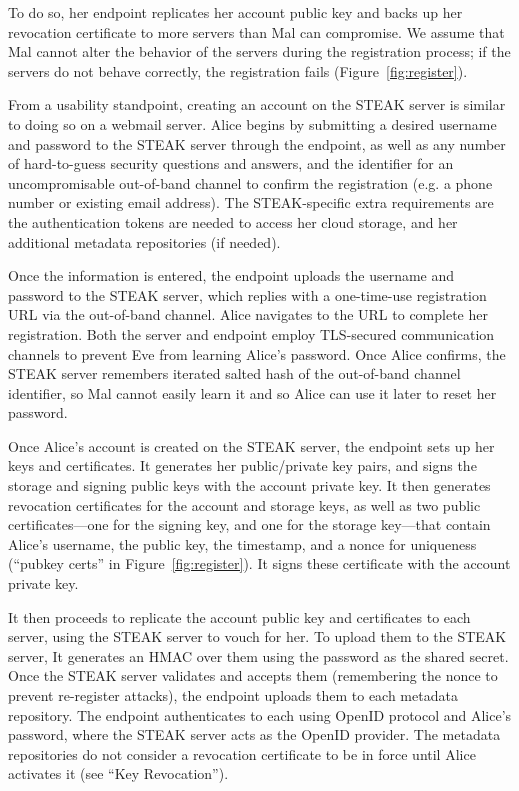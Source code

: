 To do so, her endpoint replicates her account public key and backs up her revocation certificate to more servers than Mal can compromise.  We assume that Mal cannot alter the behavior of the servers during the registration process; if the servers do not behave correctly, the registration fails (Figure~\ref{fig:register}).

From a usability standpoint, creating an account on the STEAK server is similar to doing so on a webmail server.  Alice begins by submitting a desired username and password to the STEAK server through the endpoint, as well as any number of hard-to-guess security questions and answers, and the identifier for an uncompromisable out-of-band channel to confirm the registration (e.g. a phone number or existing email address).  The STEAK-specific extra requirements are the authentication tokens are needed to access her cloud storage, and her additional metadata repositories (if needed).

Once the information is entered, the endpoint uploads the username and password to the STEAK server, which replies with a one-time-use registration URL via the out-of-band channel.  Alice navigates to the URL to complete her registration.  Both the server and endpoint employ TLS-secured communication channels to prevent Eve from learning Alice’s password.  Once Alice confirms, the STEAK server remembers iterated salted hash of the out-of-band channel identifier, so Mal cannot easily learn it and so Alice can use it later to reset her password.

Once Alice’s account is created on the STEAK server, the endpoint sets up her keys and certificates.  It generates her public/private key pairs, and signs the storage and signing public keys with the account private key.  It then generates revocation certificates for the account and storage keys, as well as two public certificates---one for the signing key, and one for the storage key---that contain Alice’s username, the public key, the timestamp, and a nonce for uniqueness (“pubkey certs” in Figure~\ref{fig:register}).  It signs these certificate with the account private key.

It then proceeds to replicate the account public key and certificates to each server, using the STEAK server to vouch for her.  To upload them to the STEAK server, It generates an HMAC over them using the password as the shared secret.  Once the STEAK server validates and accepts them (remembering the nonce to prevent re-register attacks), the endpoint uploads them to each metadata repository.  The endpoint authenticates to each using OpenID protocol and Alice’s password, where the STEAK server acts as the OpenID provider.  The metadata repositories do not consider a revocation certificate to be in force until Alice activates it (see “Key Revocation”).

